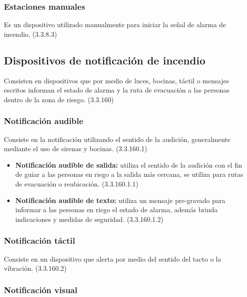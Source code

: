 \subsubsection{Estaciones manuales}

Es un dispositivo utilizado manualmente para iniciar la señal de alarma de incendio. (3.3.8.3)



\subsection{Dispositivos de notificación de incendio}

Consisten en dispositivos que por medio de luces, bocinas, táctil o mensajes escritos informan el estado de alarma y la ruta de evacuación a las personas dentro de la zona de riesgo. (3.3.160)

\subsubsection{Notificación audible}

Consiste en la notificación utilizando el sentido de la audición, generalmente mediante el uso de sirenas y  bocinas. (3.3.160.1)


\begin{itemize}
	
	\item \textbf{Notificación audible de salida:} utiliza el sentido de la audición con el fin de guiar a las personas en riego a la salida más cercana, se utiliza para rutas de evacuación o reubicación. (3.3.160.1.1)
	
	\item \textbf{Notificación audible de texto:} utiliza un mensaje pre-gravado para informar a las personas en riego el estado de alarma, además brinda indicaciones y medidas de seguridad. (3.3.160.1.2)
		
\end{itemize}


\subsubsection{Notificación táctil}

Consiste en un dispositivo que alerta por medio del sentido del tacto o la vibración. (3.3.160.2)

\subsubsection{Notificación visual}

